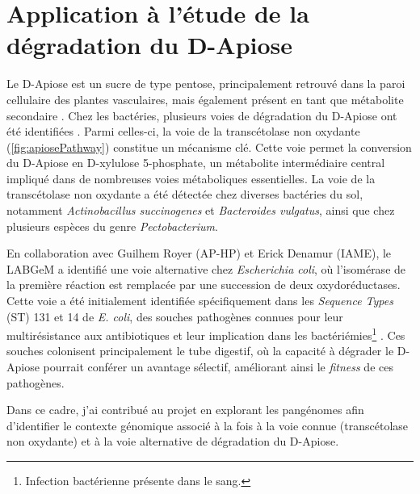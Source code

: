 \chapter{Application à l'étude de la dégradation du D-Apiose}

Le D-Apiose est un sucre de type pentose, principalement retrouvé dans la paroi cellulaire des plantes vasculaires, mais également présent en tant que métabolite secondaire \cite{picmanova_apiose_2016}. Chez les bactéries, plusieurs voies de dégradation du D-Apiose ont été identifiées \cite{carter_functional_2018}. Parmi celles-ci, la voie de la transcétolase non oxydante (\autoref{fig:apiosePathway}) constitue un mécanisme clé. Cette voie permet la conversion du D-Apiose en D-xylulose 5-phosphate, un métabolite intermédiaire central impliqué dans de nombreuses voies métaboliques essentielles. La voie de la transcétolase non oxydante a été détectée chez diverses bactéries du sol, notamment \textit{Actinobacillus succinogenes} et \textit{Bacteroides vulgatus}, ainsi que chez plusieurs espèces du genre \textit{Pectobacterium}.

En collaboration avec Guilhem Royer (AP-HP) et Erick Denamur (IAME), le LABGeM a identifié une voie alternative chez \textit{Escherichia coli}, où l'isomérase de la première réaction est remplacée par une succession de deux oxydoréductases. Cette voie a été initialement identifiée spécifiquement dans les \textit{Sequence Types} (ST) 131 et 14 de \textit{E. coli}, des souches pathogènes connues pour leur multirésistance aux antibiotiques et leur implication dans les bactériémies\footnote{Infection bactérienne présente dans le sang.} \cite{schembri_molecular_2015,de_korne-elenbaas_putative_2023}. Ces souches colonisent principalement le tube digestif, où la capacité à dégrader le D-Apiose pourrait conférer un avantage sélectif, améliorant ainsi le \textit{fitness} de ces pathogènes.

Dans ce cadre, j’ai contribué au projet en explorant les pangénomes afin d’identifier le contexte génomique associé à la fois à la voie connue (transcétolase non oxydante) et à la voie alternative de dégradation du D-Apiose.

